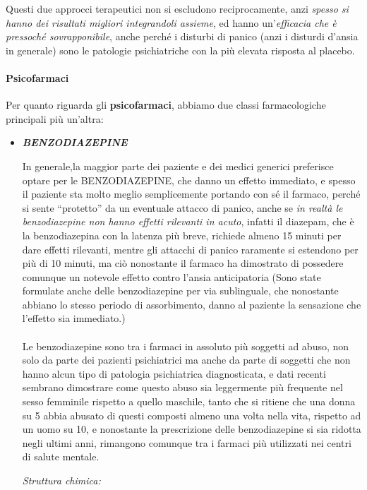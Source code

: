 Questi due approcci terapeutici non si escludono reciprocamente, anzi
\emph{spesso si hanno dei risultati migliori integrandoli assieme}, ed
hanno un'\emph{efficacia che è pressoché sovrapponibile}, anche perché i
disturbi di panico (anzi i disturdi d'ansia in generale) sono le
patologie psichiatriche con la più elevata risposta al placebo.

\paragraph{Psicofarmaci}

Per quanto riguarda gli \textbf{psicofarmaci}, abbiamo due classi
farmacologiche principali più un'altra:

\begin{itemize}
\item
  \emph{\textbf{BENZODIAZEPINE}}

In generale,la maggior parte dei paziente e dei medici generici
preferisce optare per le BENZODIAZEPINE, che danno un effetto immediato,
e spesso il paziente sta molto meglio semplicemente portando con sé il
farmaco, perché si sente ``protetto'' da un eventuale attacco di panico,
anche se \emph{in realtà le benzodiazepine non hanno effetti rilevanti
in acuto}, infatti il diazepam, che è la benzodiazepina con la latenza
più breve, richiede almeno 15 minuti per dare effetti rilevanti, mentre
gli attacchi di panico raramente si estendono per più di 10 minuti, ma
ciò nonostante il farmaco ha dimostrato di possedere comunque un
notevole effetto contro l'ansia anticipatoria (Sono state formulate
anche delle benzodiazepine per via sublinguale, che nonostante abbiano
lo stesso periodo di assorbimento, danno al paziente la sensazione che
l'effetto sia immediato.)
\\\\
Le benzodiazepine sono tra i farmaci in assoluto più soggetti ad abuso,
non solo da parte dei pazienti psichiatrici ma anche da parte di
soggetti che non hanno alcun tipo di patologia psichiatrica
diagnosticata, e dati recenti sembrano dimostrare come questo abuso sia
leggermente più frequente nel sesso femminile rispetto a quello
maschile, tanto che si ritiene che una donna su 5 abbia abusato di
questi composti almeno una volta nella vita, rispetto ad un uomo su 10,
e nonostante la prescrizione delle benzodiazepine si sia ridotta negli
ultimi anni, rimangono comunque tra i farmaci più utilizzati nei centri
di salute mentale.

\emph{\emph{Struttura chimica:}}


\end{itemize}
